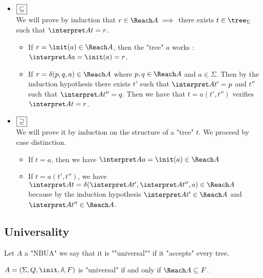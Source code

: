 \documentclass{article}
\begin{document}
\begin{proofI}
	\begin{itemize}
		\item $\fbox{$\subseteq$}$\vspace{0.15cm}\\
		      We will prove by induction that $r \in \Reach A \implies$ there exists $t \in \tree_\Sigma$ such that
		      $\interpret A t = r$.

		      \begin{itemize}
			      \item If $r = \init(a) \in \Reach A$, then the "tree" $a$ works : $\interpret A a = \init (a) = r$.
			      \item If $r = \delta (p,q,a) \in \Reach A$ where $p,q \in \Reach A$ and $a \in \Sigma$. Then by the induction hypothesis
			            there exists $t'$ such that $\interpret A {t'} = p$ and $t''$ such that $\interpret A {t''} = q$.
			            Then we have that $t = a(t',t'')$ verifies $\interpret A t = r$.
		      \end{itemize}
		\item $\fbox{$\supseteq$}$\vspace{0.15cm}\\
		      We will prove it by induction on the structure of a "tree" $t$. We proceed by case distinction.
		      \begin{itemize}
			      \item If $t = a$, then we have $ \interpret A a = \init (a) \in \Reach A$
			      \item If $t = a(t',t'')$, we have $ \interpret A t = \delta(\interpret A {t'}, \interpret A {t''}, a) \in \Reach A$
			            because by the induction hypothesis $\interpret A {t'} \in \Reach A$  and $\interpret A {t''} \in \Reach A$.
		      \end{itemize}
	\end{itemize}
\end{proofI}

\subsection{Universality}

\begin{definition}
	Let $A $ a "NBUA" we say that it is ""universal"" if it "accepts" every tree.
\end{definition}


\begin{theorem}
	$A = \DBUA$ is "universal" if and only if $\Reach A \subseteq F$.
\end{theorem}
\end{document}
